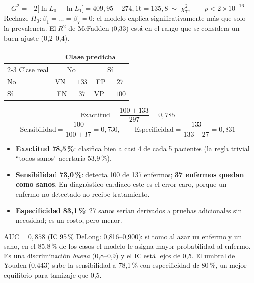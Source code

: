 \[
G^2=-2\big[\ln L_0-\ln L_1\big]=409,95-274,16=135,8\;\sim\;\chi^2_7,\qquad p<2\times10^{-16}
\]
Rechazo $H_0:\beta_1=\dots=\beta_7=0$: el modelo explica significativamente más que solo la prevalencia.
El $R^2$ de McFadden (0,33) está en el rango que se considera un buen ajuste (0,2--0,4).
\begin{center}\small
\begin{tabular}{lcc}
\toprule
& \multicolumn{2}{c}{Clase predicha} \\ \cmidrule(lr){2-3}
Clase real & No & Sí \\ \midrule
No & VN $=133$ & FP $=27$ \\
Sí & FN $=37$ & VP $=100$ \\ \bottomrule
\end{tabular}
\end{center}
\[
\text{Exactitud}=\frac{100+133}{297}=0,785
\]
\[
\text{Sensibilidad}=\frac{100}{100+37}=0,730,\qquad
\text{Especificidad}=\frac{133}{133+27}=0,831
\]
\begin{itemize}[leftmargin=1.2em]
  \item[\color{cTeal}\faCheck] \textbf{Exactitud 78,5\,\%}: clasifica bien a casi 4 de cada 5 pacientes
  (la regla trivial ``todos sanos'' acertaría 53,9\,\%).
  \item[\color{cRed}\faExclamationTriangle] \textbf{Sensibilidad 73,0\,\%}: detecta 100 de 137 enfermos;
  \textbf{37 enfermos quedan como sanos}. En diagnóstico cardíaco este es el error caro, porque un enfermo
  no detectado no recibe tratamiento.
  \item[\color{cTeal}\faIcon{shield-alt}] \textbf{Especificidad 83,1\,\%}: 27 sanos serían derivados a pruebas
  adicionales sin necesidad; es un costo, pero menor.
\end{itemize}


$\text{AUC}=0,858$ (IC 95\,\% DeLong: 0,816--0,900): si tomo al azar un enfermo y un sano, en el 85,8\,\% de
los casos el modelo le asigna mayor probabilidad al enfermo. Es una discriminación \emph{buena} (0,8--0,9) y el
IC está lejos de 0,5. El umbral de Youden (0,443) sube la sensibilidad a 78,1\,\% con especificidad de 80\,\%,
un mejor equilibrio para tamizaje que 0,5.

